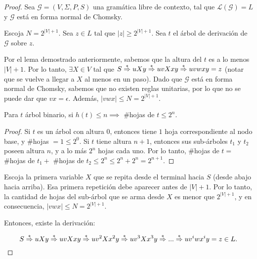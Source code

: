 \documentclass[a4paper,twoside,master.tex]{article}
\begin{document}
\begin{proof}
    Sea $\mathcal{G} = (V, \Sigma, P, S)$ una gramática libre de contexto, tal que $\mathcal{L}(\mathcal{G}) = L$ y $\mathcal{G}$ está en forma normal de Chomsky.

    Escoja $N = 2^{|V| + 1}$. Sea $z \in L$ tal que $|z| \ge 2^{|V| + 1}$. Sea $t$ el árbol de derivación de $\mathcal{G}$ sobre $z$.

    Por el lema demostrado anteriormente, sabemos que la altura del $t$ es a lo menos $|V| + 1$. Por lo tanto, $\exists X \in V$ tal que $S \derives* u X y \derives* u v X x y \derives* u v w x y = z$ (notar que se vuelve a llegar a $X$ al menos en un paso). Dado que $\mathcal{G}$ está en forma normal de Chomsky, sabemos que no existen reglas unitarias, por lo que no se puede dar que $v x = \epsilon$. Además, $|v w x| \le N = 2^{|V| + 1}$.

    \begin{lema}
        Para $t$ árbol binario, si $h(t) \le n \implies$ \#hojas de $t \le 2^n$.
    \end{lema}
    \begin{proof}
        Si $t$ es un árbol con altura $0$, entonces tiene $1$ hoja correspondiente al nodo base, y \#hojas $ = 1 \le 2^0$. Si $t$ tiene altura $n + 1$, entonces sus sub-árboles $t_1$ y $t_2$ poseen altura $n$, y a lo más $2^n$ hojas cada uno. Por lo tanto, \#hojas de $t = $ \#hojas de $t_1 + $ \#hojas de $t_2 \le 2^n \le 2^n + 2^n = 2^{n + 1}$.
    \end{proof}

    Escoja la primera variable $X$ que se repita desde el terminal hacia $S$ (desde abajo hacia arriba). Esa primera repetición debe aparecer antes de $|V| + 1$. Por lo tanto, la cantidad de hojas del sub-árbol que se arma desde $X$ es menor que $2^{|V| + 1}$, y en consecuencia, $|v w x| \le N = 2^{|V| + 1}$.

    Entonces, existe la derivación:

    \[
        S \derives* u X y \derives* u v X x y \derives* u v^2 X x^2 y \derives* u v^3 X x^3 y \derives* ... \derives* u v^i w x^i y = z \in L
        .
    \]
\end{proof}
\end{document}

